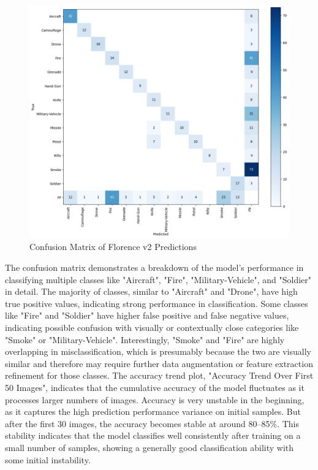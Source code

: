 \documentclass[fleqn,10pt,lineno]{wlpeerj}
\begin{document}
\begin{figure} [H]
    \centering
    \includegraphics[width=1\linewidth]{confusion_matrix.png}
    \caption{Confusion Matrix of Florence v2 Predictions}
    \label{fig:confusion-matrix}
\end{figure}

The confusion matrix demonstrates a breakdown of the model's performance in classifying multiple classes like "Aircraft", "Fire", "Military-Vehicle", and "Soldier" in detail. The majority of classes, similar to "Aircraft" and "Drone", have high true positive values, indicating strong performance in classification. Some classes like "Fire" and "Soldier" have higher false positive and false negative values, indicating possible confusion with visually or contextually close categories like "Smoke" or "Military-Vehicle". Interestingly, "Smoke" and "Fire" are highly overlapping in misclassification, which is presumably because the two are visually similar and therefore may require further data augmentation or feature extraction refinement for those classes. The accuracy trend plot, "Accuracy Trend Over First 50 Images", indicates that the cumulative accuracy of the model fluctuates as it processes larger numbers of images. Accuracy is very unstable in the beginning, as it captures the high prediction performance variance on initial samples. But after the first 30 images, the accuracy becomes stable at around 80–85\%. This stability indicates that the model classifies well consistently after training on a small number of samples, showing a generally good classification ability with some initial instability.
\end{document}
